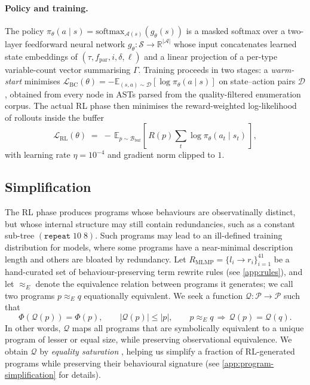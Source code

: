 \documentclass[12pt]{article}
\begin{document}
\paragraph{Policy and training.} The policy $\pi_\theta(a \mid s) = \mathrm{softmax}_{\mathcal{A}(s)}(g_\theta(s))$ is a masked softmax over a two-layer feedforward neural network $g_\theta: \mathcal{S} \to \mathbb{R}^{|\mathcal{A}|}$ whose input concatenates learned state embeddings of $(\tau, f_{\text{par}}, i, \delta, \ell)$ and a linear projection of a per-type variable-count vector summarising $\Gamma$. Training proceeds in two stages: a \emph{warm-start} minimises $\mathcal{L}_{\mathrm{BC}}(\theta) = -\mathbb{E}_{(s,a)\sim\mathcal{D}}[\log \pi_\theta(a \mid s)]$ on state--action pairs $\mathcal{D}$, obtained from every node in ASTs parsed from the quality-filtered enumeration corpus. The actual RL phase then minimises the reward-weighted log-likelihood of rollouts inside the buffer \citep{abolafia2018priority}
\begin{equation}
  \mathcal{L}_{\mathrm{RL}}(\theta) \;=\; -\,\mathbb{E}_{p\sim\mathcal{B}_{\mathrm{buf}}}\!\left[\,R(p) \sum_{t} \log \pi_\theta(a_t \mid s_t)\,\right],
  \label{eq:rl-loss}
\end{equation}
with learning rate $\eta = 10^{-4}$ and gradient norm clipped to $1$.

\subsection{Simplification}
\label{sec:simplification}

The RL phase produces programs whose behaviours are observatinally distinct, but whose internal structure may still contain redundancies, such as a constant sub-tree $(\texttt{repeat}\;10\;8)$. Such programs may lead to an ill-defined training distribution for models, where some programs have a near-minimal description length and others are bloated by redundancy. Let $R_{\text{MLMP}} = \{l_i \to r_i\}_{i=1}^{41}$ be a hand-curated set of behaviour-preserving term rewrite rules (see \cref{app:rules}), and let $\approx_E$ denote the equivalence relation between programs it generates; we call two programs $p \approx_E q$ equationally equivalent. We seek a function $\mathcal{Q}: \mathcal{P} \to \mathcal{P}$ such that
\begin{equation}
  \Phi(\mathcal{Q}(p)) = \Phi(p), \qquad |\mathcal{Q}(p)| \leq |p|, \qquad p \approx_E q \,\Rightarrow\, \mathcal{Q}(p) = \mathcal{Q}(q).
  \label{eq:Q-spec}
\end{equation}
In other words, $\mathcal{Q}$ maps all programs that are symbolically equivalent to a unique program of lesser or equal size, while preserving observational equivalence. We obtain $\mathcal{Q}$ by \emph{equality saturation} \citep{tate2009equality, willsey2021egg}, helping us simplify a fraction of RL-generated programs while preserving their behavioural signature (see \cref{app:program-simplification} for details).
\end{document}
